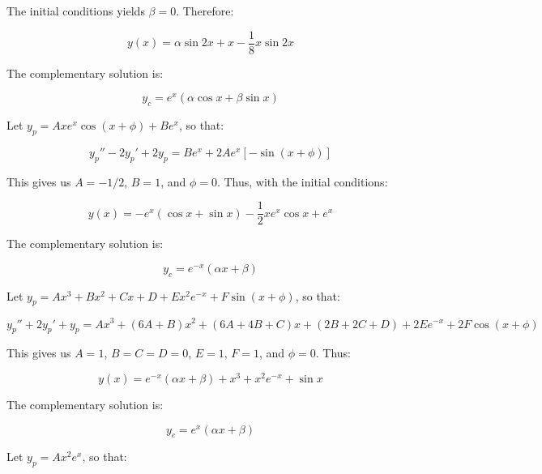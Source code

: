 \documentclass[12pt]{article}
\begin{document}
The initial conditions yields $\beta = 0$. Therefore:

\begin{equation}
    y(x) = \alpha \sin{2x} + x - \frac{1}{8}x\sin{2x}
\end{equation}

The complementary solution is:

\begin{equation}
    y_{c} = e^{x}(\alpha \cos{x} + \beta \sin{x})
\end{equation}

Let $y_{p} = Axe^{x}\cos{(x + \phi)} + Be^{x}$, so that:

\begin{equation}
    y_{p}'' - 2y_{p}' + 2y_{p} = Be^{x} + 2Ae^{x}[-\sin{(x + \phi)}]
\end{equation}

This gives us $A = -1/2$, $B = 1$, and $\phi = 0$. Thus, with the initial conditions:

\begin{equation}
    y(x) = -e^{x}(\cos{x} + \sin{x}) - \frac{1}{2}xe^{x}\cos{x} + e^{x}
\end{equation}

The complementary solution is:

\begin{equation}
    y_{c} = e^{-x}(\alpha x + \beta)
\end{equation}

Let $y_{p} = Ax^{3} + Bx^{2} + Cx + D + Ex^{2}e^{-x} + F\sin{(x + \phi)}$, so that:

\begin{equation}
    y_{p}'' + 2y_{p}' + y_{p} = Ax^{3} + (6A + B)x^{2} + (6A + 4B + C)x + (2B + 2C + D) + 2Ee^{-x} + 2F\cos{(x + \phi)}
\end{equation}

This gives us $A = 1$, $B = C = D = 0$, $E = 1$, $F = 1$, and $\phi = 0$. Thus:

\begin{equation}
    y(x) = e^{-x}(\alpha x + \beta) + x^{3} + x^{2}e^{-x} + \sin{x}
\end{equation}

The complementary solution is:

\begin{equation}
    y_{c} = e^{x}(\alpha x + \beta)
\end{equation}

Let $y_{p} = Ax^{2}e^{x}$, so that:
\end{document}
